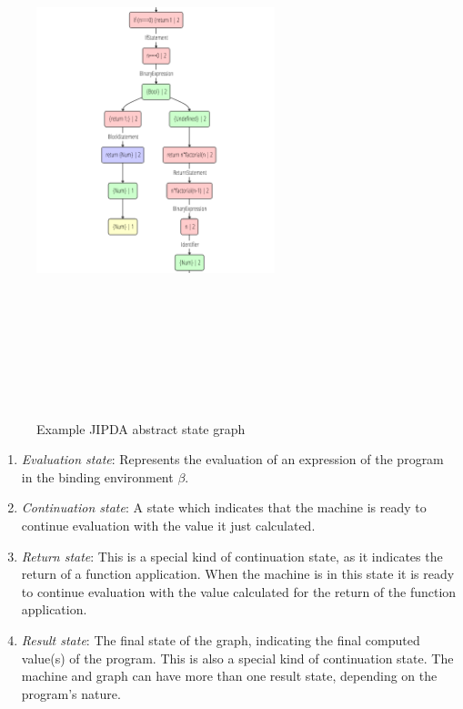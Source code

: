\begin{figure}[!ht]
    \centering
      \includegraphics[width=262px, height=606px, keepaspectratio]{images/JipdaGraph} 
      \caption{Example JIPDA abstract state graph}
    \label{fig:JipdaGraph}
\end{figure}

\begin{enumerate}
\item \textit{Evaluation state}: Represents the evaluation of an expression of the program in the binding environment $\beta$.
\item \textit{Continuation state}: A state which indicates that the machine is ready to continue evaluation with the value it just calculated.
\item \textit{Return state}: This is a special kind of continuation state, as it indicates the return of a function application. When the machine is in this state it is ready to continue evaluation with the value calculated for the return of the function application.
\item \textit{Result state}: The final state of the graph, indicating the final computed value(s) of the program. This is also a special kind of continuation state. The machine and graph can have more than one result state, depending on the program's nature. 
\end{enumerate}

